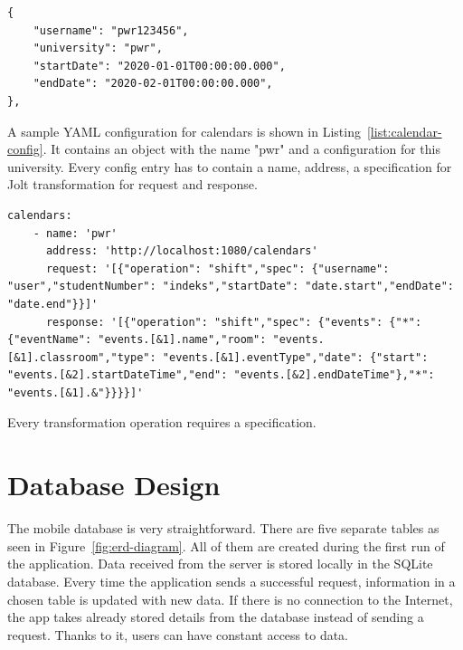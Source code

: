 \begin{lstlisting}[label=list:login-request,caption=Sample calendar request, basicstyle=\footnotesize\ttfamily]
{
    "username": "pwr123456",
    "university": "pwr",
    "startDate": "2020-01-01T00:00:00.000",
    "endDate": "2020-02-01T00:00:00.000",
},
\end{lstlisting}

A sample YAML configuration for calendars is shown in Listing~\ref{list:calendar-config}. It contains an object with the name "pwr" and a configuration for this university. Every config entry has to contain a name, address, a specification for Jolt transformation for request and response.

\begin{lstlisting}[label=list:calendar-config,caption=Sample YAML configuration for calendars, basicstyle=\footnotesize\ttfamily, breaklines=true]
calendars:
    - name: 'pwr'
      address: 'http://localhost:1080/calendars'
      request: '[{"operation": "shift","spec": {"username": "user","studentNumber": "indeks","startDate": "date.start","endDate": "date.end"}}]'
      response: '[{"operation": "shift","spec": {"events": {"*": {"eventName": "events.[&1].name","room": "events.[&1].classroom","type": "events.[&1].eventType","date": {"start": "events.[&2].startDateTime","end": "events.[&2].endDateTime"},"*": "events.[&1].&"}}}}]'
\end{lstlisting}

Every transformation operation requires a specification.


\section{Database Design}

The mobile database is very straightforward. There are five separate tables as seen in Figure~\ref{fig:erd-diagram}. All of them are created during the first run of the application. Data received from the server is stored locally in the SQLite database. Every time the application sends a successful request, information in a chosen table is updated with new data. If there is no connection to the Internet, the app takes already stored details from the database instead of sending a request. Thanks to it, users can have constant access to data.

